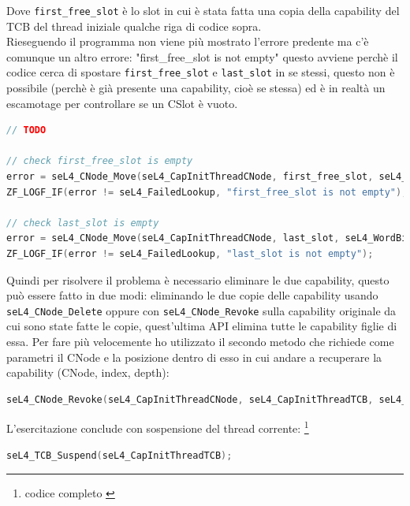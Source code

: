 Dove \texttt{first\_free\_slot} è lo slot in cui è stata fatta una copia della capability del TCB del thread iniziale qualche riga di codice sopra.\\
Rieseguendo il programma non viene più mostrato l'errore predente ma c'è comunque un altro errore: "first\_free\_slot is not empty" questo avviene perchè il codice cerca di spostare \texttt{first\_free\_slot} e \texttt{last\_slot} in se stessi, questo non è possibile (perchè è già presente una capability, cioè se stessa) ed è in realtà un escamotage per controllare se un CSlot è vuoto.
\begin{lstlisting}[language=C++]
// TODO 
         
// check first_free_slot is empty
error = seL4_CNode_Move(seL4_CapInitThreadCNode, first_free_slot, seL4_WordBits, seL4_CapInitThreadCNode, first_free_slot, seL4_WordBits);
ZF_LOGF_IF(error != seL4_FailedLookup, "first_free_slot is not empty");

// check last_slot is empty
error = seL4_CNode_Move(seL4_CapInitThreadCNode, last_slot, seL4_WordBits, seL4_CapInitThreadCNode, last_slot, seL4_WordBits);
ZF_LOGF_IF(error != seL4_FailedLookup, "last_slot is not empty");
\end{lstlisting}
Quindi per risolvere il problema è necessario eliminare le due capability, questo può essere fatto in due modi: eliminando le due copie delle capability usando \texttt{seL4\_CNode\_Delete} oppure con \texttt{seL4\_CNode\_Revoke} sulla capability originale da cui sono state fatte le copie, quest'ultima API elimina tutte le capability figlie di essa. Per fare più velocemente ho utilizzato il secondo metodo che richiede come parametri il CNode e la posizione dentro di esso in cui andare a recuperare la capability (CNode, index, depth):
\begin{lstlisting}[language=C++]
seL4_CNode_Revoke(seL4_CapInitThreadCNode, seL4_CapInitThreadTCB, seL4_WordBits);
\end{lstlisting}
L'esercitazione conclude con sospensione del thread corrente: \footnote{codice completo \cite{capability}}
\begin{lstlisting}[language=C++]
seL4_TCB_Suspend(seL4_CapInitThreadTCB);
\end{lstlisting}

